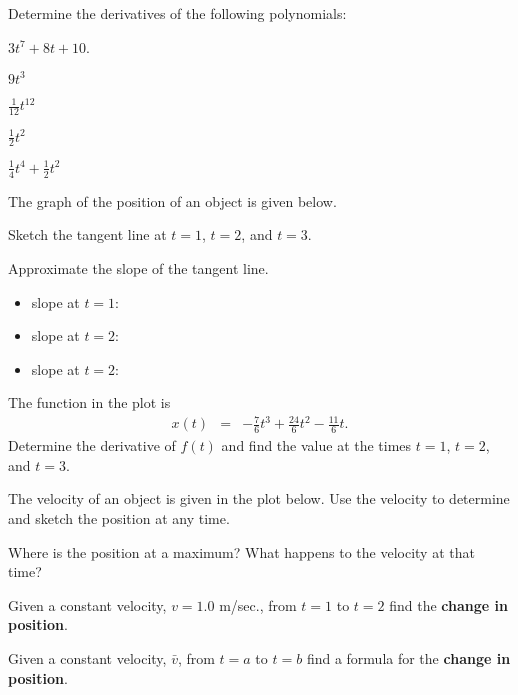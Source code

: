 \begin{problem}
\item Determine the derivatives of the following polynomials:
  \begin{subproblem}
    \item $3 t^7 +8 t + 10 $.
      \vfill
    \item $9t^3$
      \vfill
    \item $\frac{1}{12} t^{12}$
      \vfill
    \item $\frac{1}{2} t^{2}$
      \vfill
    \item $\frac{1}{4} t^{4}+\frac{1}{2}t^2$
      \vfill
  \end{subproblem}
  \clearpage

\item The graph of the position of an object is given below.

  \scalebox{0.6}{}

  \begin{subproblem}
  \item Sketch the tangent line at $t=1$, $t=2$, and $t=3$.
  \item Approximate the slope of the tangent line.
    \begin{itemize}
    \item slope at $t=1$:
    \item slope at $t=2$:
    \item slope at $t=2$:
    \end{itemize}
  \item The function in the plot is 
    \begin{eqnarray*}
      x(t) & = & -\frac{7}{6} t^3 + \frac{24}{6} t^2 - \frac{11}{6} t.
    \end{eqnarray*}
    Determine the derivative of $f(t)$ and find the value at the times
    $t=1$, $t=2$, and $t=3$.
    \vfill
  \end{subproblem}
  \clearpage

\item The velocity of an object is given in the plot below. Use the
  velocity to determine and sketch the position at any time.

  \scalebox{0.7}{}


  \begin{subproblem}
  \item Where is the position at a maximum? What happens to the
    velocity at that time? 
    \vspace{3em}
  \item Given a constant velocity, $v=1.0$ m/sec., from $t=1$ to $t=2$
    find the \textbf{change in position}.  
    \vfill
  \item Given a constant velocity, $\bar{v}$, from $t=a$ to $t=b$ find
    a formula for the \textbf{change in position}.
    \vfill
  \end{subproblem}

\end{problem}

